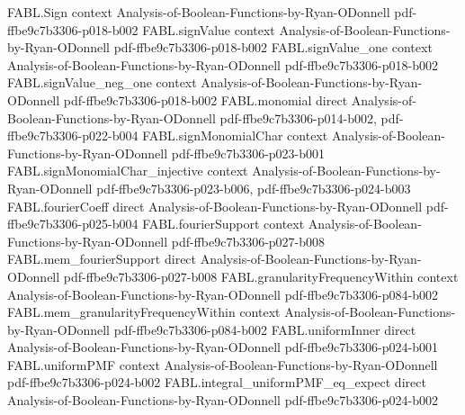 \begin{theorem}
\label{FABL.pmfExpectation_abs_sub_mean_eq_variance_of_hasSignRange}
\leanok
{}
\proofstep
  {FABL.Sign}
  {context}
  {Analysis-of-Boolean-Functions-by-Ryan-ODonnell}
  {pdf-ffbe9c7b3306-p018-b002}
\proofstep
  {FABL.signValue}
  {context}
  {Analysis-of-Boolean-Functions-by-Ryan-ODonnell}
  {pdf-ffbe9c7b3306-p018-b002}
\proofstep
  {FABL.signValue_one}
  {context}
  {Analysis-of-Boolean-Functions-by-Ryan-ODonnell}
  {pdf-ffbe9c7b3306-p018-b002}
\proofstep
  {FABL.signValue_neg_one}
  {context}
  {Analysis-of-Boolean-Functions-by-Ryan-ODonnell}
  {pdf-ffbe9c7b3306-p018-b002}
\proofstep
  {FABL.monomial}
  {direct}
  {Analysis-of-Boolean-Functions-by-Ryan-ODonnell}
  {pdf-ffbe9c7b3306-p014-b002,
    pdf-ffbe9c7b3306-p022-b004}
\proofstep
  {FABL.signMonomialChar}
  {context}
  {Analysis-of-Boolean-Functions-by-Ryan-ODonnell}
  {pdf-ffbe9c7b3306-p023-b001}
\proofstep
  {FABL.signMonomialChar_injective}
  {context}
  {Analysis-of-Boolean-Functions-by-Ryan-ODonnell}
  {pdf-ffbe9c7b3306-p023-b006,
    pdf-ffbe9c7b3306-p024-b003}
\proofstep
  {FABL.fourierCoeff}
  {direct}
  {Analysis-of-Boolean-Functions-by-Ryan-ODonnell}
  {pdf-ffbe9c7b3306-p025-b004}
\proofstep
  {FABL.fourierSupport}
  {context}
  {Analysis-of-Boolean-Functions-by-Ryan-ODonnell}
  {pdf-ffbe9c7b3306-p027-b008}
\proofstep
  {FABL.mem_fourierSupport}
  {direct}
  {Analysis-of-Boolean-Functions-by-Ryan-ODonnell}
  {pdf-ffbe9c7b3306-p027-b008}
\proofstep
  {FABL.granularityFrequencyWithin}
  {context}
  {Analysis-of-Boolean-Functions-by-Ryan-ODonnell}
  {pdf-ffbe9c7b3306-p084-b002}
\proofstep
  {FABL.mem_granularityFrequencyWithin}
  {context}
  {Analysis-of-Boolean-Functions-by-Ryan-ODonnell}
  {pdf-ffbe9c7b3306-p084-b002}
\proofstep
  {FABL.uniformInner}
  {direct}
  {Analysis-of-Boolean-Functions-by-Ryan-ODonnell}
  {pdf-ffbe9c7b3306-p024-b001}
\proofstep
  {FABL.uniformPMF}
  {context}
  {Analysis-of-Boolean-Functions-by-Ryan-ODonnell}
  {pdf-ffbe9c7b3306-p024-b002}
\proofstep
  {FABL.integral_uniformPMF_eq_expect}
  {direct}
  {Analysis-of-Boolean-Functions-by-Ryan-ODonnell}
  {pdf-ffbe9c7b3306-p024-b002}

\end{theorem}
